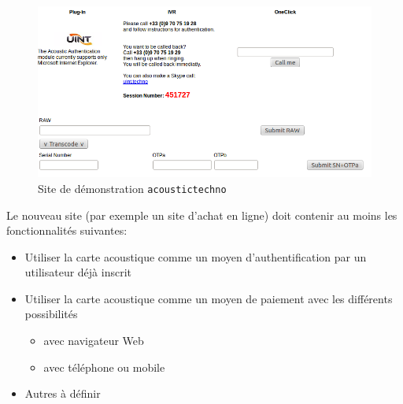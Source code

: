 \begin{figure}[!htbp]
  \centering
    \includegraphics[scale=0.5]{images/d6}
    \caption{Site de démonstration \texttt{acoustictechno}}
\end{figure}


Le nouveau site (par exemple un site d'achat en ligne) doit contenir au moins les fonctionnalités suivantes:\\

\begin{itemize}
\item Utiliser la carte acoustique comme un moyen d'authentification par un utilisateur déjà inscrit
\item Utiliser la carte acoustique comme un moyen de paiement avec les différents possibilités 
  \begin{itemize}
  \item avec navigateur Web
  \item avec téléphone ou mobile
  \end{itemize}
\item Autres à définir
\end{itemize}


















